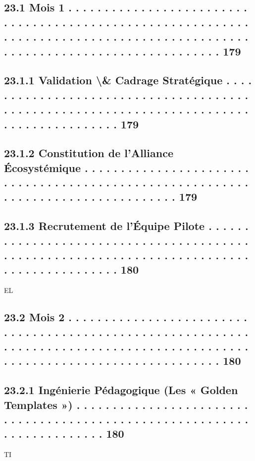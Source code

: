 \documentclass[12pt,landscape,a4paper]{article}
\begin{document}
\subsection{23.1    Mois 1 . . . . . . . . . . . . . . . . . . . . . . . . . . . . . . . . . . . . . . . . . . . . . . . . . . . . . . . . . . . . . . . . . . . . . . . . . . . . . . . . . . . . . . . . . . . . . . . . . . . . . . . . . . . . . . . . . . . . . . . . . . . 179}
\subsection{23.1.1               Validation \textbackslash{}& Cadrage Stratégique . . . . . . . . . . . . . . . . . . . . . . . . . . . . . . . . . . . . . . . . . . . . . . . . . . . . . . . . . . . . . . . . . . . . . . . . . . . . . . . . . . . . . . . . 179}
\subsection{23.1.2               Constitution de l’Alliance Écosystémique . . . . . . . . . . . . . . . . . . . . . . . . . . . . . . . . . . . . . . . . . . . . . . . . . . . . . . . . . . . . . . . . . . . . . . . . . . . . . . . . . 179}
\subsection{23.1.3               Recrutement de l’Équipe Pilote . . . . . . . . . . . . . . . . . . . . . . . . . . . . . . . . . . . . . . . . . . . . . . . . . . . . . . . . . . . . . . . . . . . . . . . . . . . . . . . . . . . . . . . . . . 180}
\vspace{0.5em}
\vspace{0.5em}
\vspace{0.5em}
\vspace{0.5em}
EL\\
\subsection{23.2    Mois 2 . . . . . . . . . . . . . . . . . . . . . . . . . . . . . . . . . . . . . . . . . . . . . . . . . . . . . . . . . . . . . . . . . . . . . . . . . . . . . . . . . . . . . . . . . . . . . . . . . . . . . . . . . . . . . . . . . . . . . . . . . . . 180}
\subsection{23.2.1               Ingénierie Pédagogique (Les « Golden Templates ») . . . . . . . . . . . . . . . . . . . . . . . . . . . . . . . . . . . . . . . . . . . . . . . . . . . . . . . . . . . . . . . . . . . . . . . . 180}
\vspace{0.5em}
\vspace{0.5em}
\vspace{0.5em}
\vspace{0.5em}
TI\\
\end{document}
